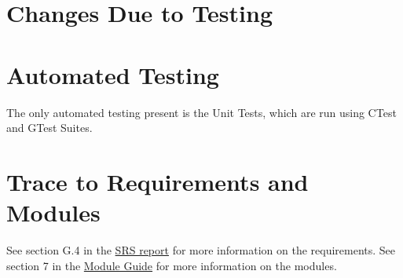 \documentclass[12pt, titlepage]{article}
\begin{document}
\section{Changes Due to Testing}


\section{Automated Testing}

The only automated testing present is the Unit Tests, which are run using CTest and GTest Suites.
		
\section{Trace to Requirements and Modules}		
See section G.4 in the \href{https://github.com/takhtart/PCD/blob/main/docs/SRS/SRS.pdf}{SRS report} for more information on the requirements. See section 7 in the \href{https://github.com/takhtart/PCD/blob/main/docs/Design/SoftArchitecture/MG.pdf}{Module Guide} for more information on the modules.
\end{document}
